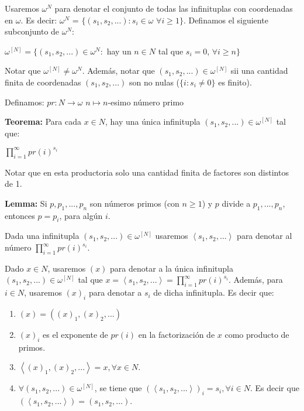 \documentclass{article}
\begin{document}
\begin{flushleft}
Usaremos $\omega^N$ para denotar el conjunto de todas las infinituplas con coordenadas en $\omega$. Es decir: $\omega^N$ = $\{(s_1, s_2,...): s_i \in \omega$ $\forall i \geq 1\}$. Definamos el siguiente subconjunto de $\omega^N$:
\begin{center}
    $\omega^{[N]} = \{(s_1, s_2, ...) \in \omega^N : $ hay un $n \in N$ tal que $s_i = 0$, $\forall i \geq n\}$
\end{center}

Notar que $\omega^{[N]} \neq \omega^N$. Además, notar que $(s_1, s_2, ...) \in \omega^{[N]}$ sii una cantidad finita de coordenadas $(s_1, s_2, ...)$ son no nulas ($\{i : s_i \neq 0 \}$ es finito).

Definamos:\linebreak
\hspace*{15ex}$pr: N \rightarrow \omega$\linebreak
\hspace*{20ex}$n \mapsto n$-esimo número primo\linebreak

\textbf{Teorema:} Para cada $x \in N$, hay una única infinitupla $(s_1, s_2, ...) \in \omega^{[N]}$ tal que:
\begin{center}
    $\prod_{i=1}^{\infty} pr(i)^{s_i}$
\end{center}
Notar que en esta productoria solo una cantidad finita de factores son distintos de 1.\linebreak

\textbf{Lemma:} Si $p, p_1, ..., p_n$ son números primos (con $n \geq 1$) y $p$ divide a $p_1, ..., p_n$, entonces $p = p_i$, para algún $i$.\linebreak

Dada una infinitupla $(s_1, s_2, ...) \in \omega^{[N]}$ usaremos $\left\langle s_1, s_2, ...\right\rangle$ para denotar al número $\prod_{i=1}^{\infty} pr(i)^{s_i}$. \linebreak

Dado $x \in N$, usaremos $(x)$ para denotar a la única infinitupla $(s_1, s_2, ...) \in \omega^{[N]}$ tal que $x = \left\langle s_1, s_2, ...\right\rangle = \prod_{i=1}^{\infty} pr(i)^{s_i}$. Además, para $i \in N$, usaremos $(x)_i$ para denotar a $s_i$ de dicha infinitupla. Es decir que:
\begin{enumerate}
    \item $(x) = ((x)_1, (x)_2, ...)$
    \item $(x)_i$ es el exponente de $pr(i)$ en la factorización de $x$ como producto de primos.
    \item $\left\langle (x)_1, (x)_2, ...\right\rangle = x, \forall x \in N$.
    \item $\forall (s_1, s_2, ...) \in \omega^{[N]}$, se tiene que $(\left\langle s_1, s_2, ... \right\rangle)_i = s_i, \forall i \in N$. Es decir que $(\left\langle s_1, s_2, ... \right\rangle) = (s_1, s_2, ...)$. 
\end{enumerate}


\end{flushleft}
\end{document}

